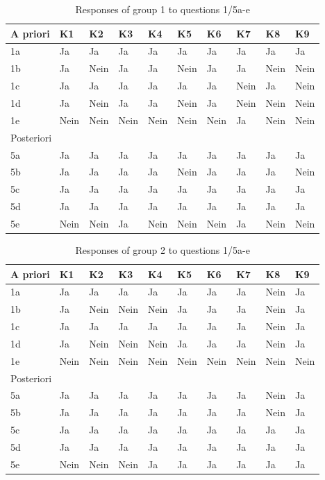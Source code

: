 \captionsetup{list=no}
\begin{table}[H]
    \centering
    \begin{tabular}{l | l  l  l  l  l  l  l  l  l  }
	A priori & K1 & K2 & K3 & K4 & K5 & K6 & K7 & K8 & K9 \\ \hline
	1a & Ja & Ja & Ja & Ja & Ja & Ja & Ja & Ja & Ja \\ %
	1b & Ja & Nein & Ja & Ja & Nein & Ja & Ja & Nein & Nein \\ %
	1c & Ja & Ja & Ja & Ja & Ja & Ja & Nein & Ja & Nein \\ %
	1d & Ja & Nein & Ja & Ja & Nein & Ja & Nein & Nein & Nein \\ %
	1e & Nein & Nein & Nein & Nein & Nein & Nein & Ja & Nein & Nein \\ %
	\multicolumn{10}{l}{Posteriori}  \\ \hline
	5a & Ja & Ja & Ja & Ja & Ja & Ja & Ja & Ja & Ja \\ %
	5b & Ja & Ja & Ja & Ja & Nein & Ja & Ja & Ja & Nein \\ %
	5c & Ja & Ja & Ja & Ja & Ja & Ja & Ja & Ja & Ja \\ %
	5d & Ja & Ja & Ja & Ja & Ja & Ja & Ja & Ja & Ja \\ %
	5e & Nein & Nein & Ja & Nein & Nein & Nein & Ja & Nein & Nein \\ %
    \end{tabular}
    \caption{Responses of group 1 to questions 1/5a-e}
    \label{tab:Video15}
\end{table}

\begin{table}[H]
    \centering
    \begin{tabular}{ l | l  l  l  l  l  l  l  l  l  }
    A priori & K1 & K2 & K3 & K4 & K5 & K6 & K7 & K8 & K9 \\ \hline
	1a & Ja & Ja & Ja & Ja & Ja & Ja & Ja & Nein & Ja \\ 
	1b & Ja & Nein & Nein & Nein & Ja & Ja & Ja & Nein & Ja \\ 
	1c & Ja & Ja & Ja & Ja & Ja & Ja & Ja & Nein & Ja \\ 
	1d & Ja & Nein & Nein & Nein & Ja & Ja & Ja & Nein & Ja \\ 
	1e & Nein & Nein & Nein & Nein & Nein & Nein & Nein & Nein & Nein \\ 
	\multicolumn{10}{l}{Posteriori}  \\ \hline
	5a & Ja & Ja & Ja & Ja & Ja & Ja & Ja & Nein & Ja \\ 
	5b & Ja & Ja & Ja & Ja & Ja & Ja & Ja & Nein & Ja \\
	5c & Ja & Ja & Ja & Ja & Ja & Ja & Ja & Ja & Ja \\ 
	5d & Ja & Ja & Ja & Ja & Ja & Ja & Ja & Ja & Ja \\
	5e & Nein & Nein & Nein & Ja & Ja & Ja & Ja & Ja & Ja \\
    \end{tabular}
    \caption{Responses of group 2 to questions 1/5a-e}
    \label{tab:Tutorial15}
\end{table}


